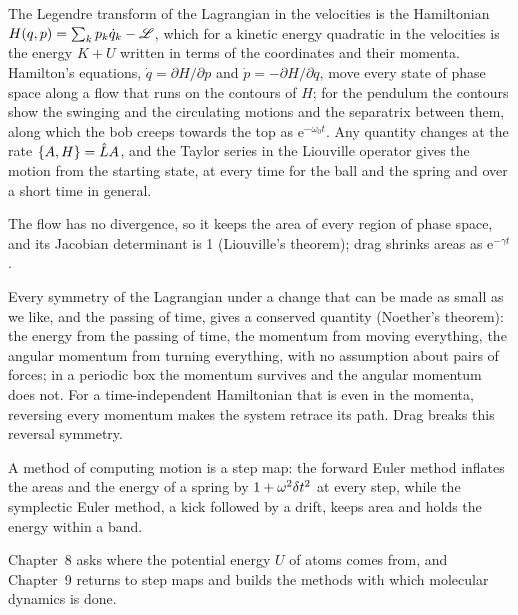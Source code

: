 
The Legendre transform of the Lagrangian in the velocities is the
Hamiltonian $H(q, p) = \sum_k p_k\dot{q}_k - \mathscr{L}$, which for a kinetic
energy quadratic in the velocities is the energy $K + U$ written in terms
of the coordinates and their momenta. Hamilton's equations, $\dot{q} =
\partial H/\partial p$ and $\dot{p} = -\partial H/\partial q$, move every
state of phase space along a flow that runs on the contours of $H$; for
the pendulum the contours show the swinging and the circulating motions
and the separatrix between them, along which the bob creeps towards the
top as $\mathrm{e}^{-\omega_0t}$. Any quantity changes at the rate $\{A, H\} = \hat{L} A$, and the
Taylor series in the Liouville operator gives the motion from the
starting state, at every time for the ball and the spring and over a
short time in general.

The flow has no divergence, so it keeps
the area of every region of phase space, and its Jacobian determinant is
1 (Liouville's theorem); drag shrinks areas as $\mathrm{e}^{-\gamma t}$.

Every symmetry of the Lagrangian under a change that can be made as small
as we like, and the passing of time, gives a conserved quantity
(Noether's theorem): the energy from
the passing of time, the momentum from moving everything, the angular
momentum from turning everything, with no assumption about pairs of
forces; in a periodic box the momentum survives and the angular momentum
does not. For a time-independent Hamiltonian that is even in the momenta,
reversing every momentum makes the system retrace its path. Drag breaks
this reversal symmetry.

A method of computing motion is a step map:
the forward Euler method inflates the areas and the energy of a spring by
$1 + \omega^2\delta t^2$ at every step, while the symplectic Euler method, a kick
followed by a drift, keeps area and holds the energy within a band.

Chapter~8 asks where the potential energy $U$ of atoms comes from, and
Chapter~9 returns to step maps and builds the methods with which
molecular dynamics is done.
